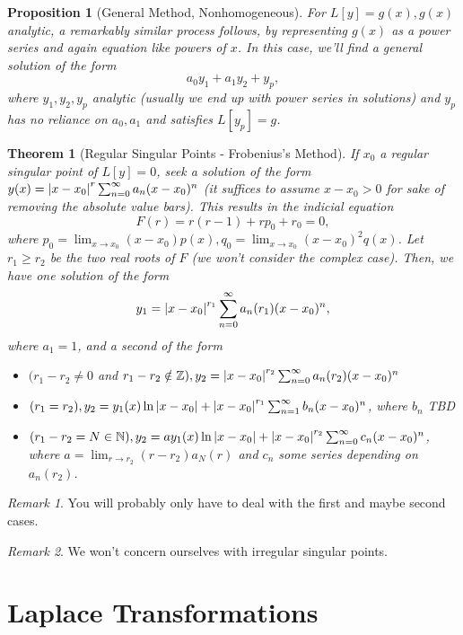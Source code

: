 \documentclass[12pt, oneside]{article}
\theoremstyle{definition}
\theoremstyle{plain}
\newtheorem{thm}{Theorem}
\newtheorem{prop}{Proposition}
\theoremstyle{remark}
\newtheorem{remark}{Remark}
\let\origsection=\section
\renewcommand\section[1]{\origsection{#1}\label{sec:\thesection}}
\begin{document}
\begin{prop}[General Method, Nonhomogeneous]
  For $L[y] = g(x), g(x)$ analytic, a remarkably similar process follows, by representing $g(x)$ as a power series and again equation like powers of $x$. In this case, we'll find a general solution of the form \[
  a_0 y_1 + a_1 y_2 + y_p,  
  \]
  where $y_1, y_2, y_p$ analytic (usually we end up with power series in solutions) and $y_p$ has no reliance on $a_0, a_1$ and satisfies $L[y_p] = g$.
\end{prop}

\begin{thm}[Regular Singular Points - Frobenius's Method]
  If $x_0$ a regular singular point of $L[y] = 0$, seek a solution of the form $y(x) = \abs{x - x_0}^r \sum_{n=0}^\infty a_n (x - x_0)^n$ (it suffices to assume $x - x_0 > 0$ for sake of removing the absolute value bars). This results in the indicial equation \[
  F(r) = r(r - 1) + rp_0 + r_0 = 0,  
  \]
  where $p_0 = \lim_{x \to x_0} (x - x_0)p(x), q_0 = \lim_{x \to x_0} (x-x_0)^2 q(x)$. Let $r_1\geq r_2$ be the two real roots of $F$ (we won't consider the complex case). Then, we have one solution of the form \[
  y_1 = \abs{x -x_0}^{r_1}\sum_{n=0}^\infty a_n(r_1)(x - x_0)^n,  
  \] where $a_1 = 1$, and a second of the form \begin{itemize}
    \item $(r_1 - r_2 \neq 0$ and $r_1 - r_2 \notin \mathbb{Z}), y_2 =  \abs{x -x_0}^{r_2}\sum_{n=0}^\infty a_n(r_2)(x - x_0)^n$
    \item $(r_1 = r_2), y_2 = y_1(x) \ln \abs{x - x_0} + \abs{x - x_0}^{r_1} \sum_{n=1}^\infty b_n (x - x_0)^n$, where $b_n$ TBD
    \item $(r_1 - r_2 = N \in \mathbb{N}), y_2 = a y_1(x) \ln \abs{x - x_0} + \abs{x - x_0}^{r_2}\sum_{n=0}^\infty c_n ( x - x_0)^n$, where $a = \lim_{r \to r_2} (r - r_2) a_N(r)$ and $c_n$ some series depending on $a_n(r_2)$.
  \end{itemize}
\end{thm}

\begin{remark}
  You will probably only have to deal with the first and maybe second cases.
\end{remark}

\begin{remark}
We won't concern ourselves with irregular singular points.  
\end{remark}

\section{Laplace Transformations}
\end{document}
